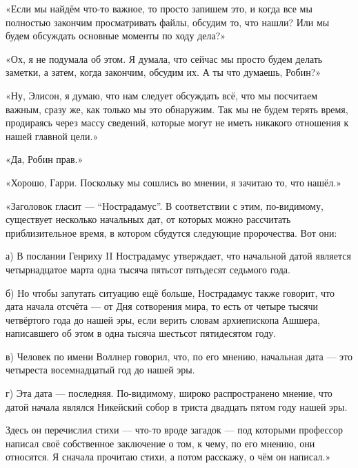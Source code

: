 \documentclass[a5paper, 9pt,
final, openany, twoside=true]{memoir}
\begin{document}
«Если мы найдём что-то важное, то просто запишем это, и когда все мы полностью закончим просматривать файлы, обсудим то, что нашли? Или мы будем обсуждать основные моменты по ходу дела?»

«Ох, я не подумала об этом. Я думала, что сейчас мы просто будем делать заметки, а затем, когда закончим, обсудим их. А ты что думаешь, Робин?»

«Ну, Элисон, я думаю, что нам следует обсуждать всё, что мы посчитаем важным, сразу же, как только мы это обнаружим. Так мы не будем терять время, продираясь через массу сведений, которые могут не иметь никакого отношения к нашей главной цели.»

«Да, Робин прав.»

«Хорошо, Гарри. Поскольку мы сошлись во мнении, я зачитаю то, что нашёл.»

«Заголовок гласит — ``Нострадамус''. В соответствии с этим, по-видимому, существует несколько начальных дат, от которых можно рассчитать приблизительное время, в котором сбудутся следующие пророчества. Вот они:\bigskip

а) В послании Генриху II Нострадамус утверждает, что начальной датой является четырнадцатое марта одна тысяча пятьсот пятьдесят седьмого года.

б) Но чтобы запутать ситуацию ещё больше, Нострадамус также говорит, что дата начала отсчёта — от Дня сотворения мира, то есть от четыре тысячи четвёртого года до нашей эры, если верить словам архиепископа Ашшера, написавшего об этом в одна тысяча шестьсот пятидесятом году.

в)  Человек по имени Воллнер говорил, что, по его мнению, начальная дата — это четыреста восемнадцатый год до нашей эры.

г) Эта дата — последняя. По-видимому, широко распространено мнение, что датой начала являлся Никейский собор в триста двадцать пятом году нашей эры.

Здесь он перечислил стихи — что-то вроде загадок — под которыми профессор написал своё собственное заключение о том, к чему, по его мнению, они относятся. Я сначала прочитаю стихи, а потом расскажу, о чём он написал.»
\end{document}

